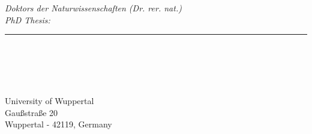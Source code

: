 {
\pagestyle{empty}
\changepage{5cm}{1cm}{-0.5cm}{-0.5cm}{}{-2cm}{}{}{}
\vspace{7mm}


{\small
\noindent 
\textit{\utscoursecode Doktors der Naturwissenschaften (Dr. rer. nat.)}\\
\textit{PhD Thesis: \utsfield}\\
\noindent 
}

\begin{center}
\par\vspace{6.5cm}

{\begin{minipage}{\textwidth}
\flushright
{
  \emph{\hfill\HUGE{\utstitle}} 
}
\noindent\rule[-1ex]{\textwidth}{4pt}\\[2.5ex]
\end{minipage}}

\vspace*{4cm}
{\begin{minipage}{\textwidth}
\flushright
{%
{\huge \emph{\utsname}}\\[3ex]} 
\end{minipage}}

\par\vspace {6.5cm}
\end{center}

\noindent%
{\small \utsfaculty \\
University of Wuppertal\\
Gau{\ss}stra{\ss}e 20\\
Wuppertal - 42119, Germany}
\clearpage
}

\utsclearemptydoublepage
